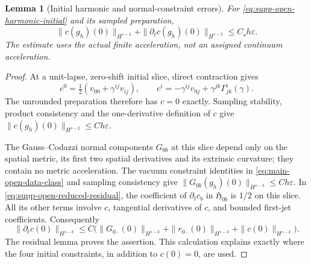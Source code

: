 \documentclass[11pt]{article}
\numberwithin{equation}{section}
\newtheorem{lemma}[lemma]{Lemma}
\theoremstyle{definition}
\theoremstyle{remark}
\begin{document}
\begin{lemma}[Initial harmonic and normal-constraint errors]
\label{lem:supp-open-initial-gauge}
For \eqref{eq:supp-open-harmonic-initial} and its sampled preparation,
\begin{equation}
 \|c(g_h)(0)\|_{H^{s-2}}
 +\|\partial_tc(g_h)(0)\|_{H^{s-3}}
 \le C_sh\varepsilon.
 \label{eq:supp-open-initial-gauge-bound}
\end{equation}
The estimate uses the actual finite acceleration, not an assigned
continuum acceleration.
\end{lemma}
\begin{proof}
At a unit-lapse, zero-shift initial slice, direct contraction gives
\[
 c^0=\tfrac12(v_{00}+\gamma^{ij}v_{ij}),\qquad
 c^i=-\gamma^{ij}v_{0j}
       +\gamma^{jk}\Gamma^i_{jk}(\gamma).
\]
The unrounded preparation therefore has $c=0$ exactly.  Sampling stability,
product consistency and the one-derivative definition of $c$ give
$\|c(g_h)(0)\|_{H^{s-2}}\le Ch\varepsilon$.

The Gauss--Codazzi normal components $G_{0b}$ at this slice depend only on
the spatial metric, its first two spatial derivatives and its extrinsic
curvature; they contain no metric acceleration.  The vacuum constraint
identities in \eqref{eq:main-open-data-class} and sampling consistency give
$\|G_{0b}(g_h)(0)\|_{H^{s-3}}\le Ch\varepsilon$.
In \eqref{eq:supp-open-reduced-residual}, the coefficient of
$\partial_tc_b$ in $\mathfrak H_{0b}$ is $1/2$ on this slice.  All its
other terms involve $c$, tangential derivatives of $c$, and bounded
first-jet coefficients.  Consequently
\[
 \|\partial_tc(0)\|_{H^{s-3}}
 \le C\bigl(\|G_{0\cdot}(0)\|_{H^{s-3}}
       +\|r_{0\cdot}(0)\|_{H^{s-3}}
       +\|c(0)\|_{H^{s-2}}\bigr).
\]
The residual lemma proves the assertion.  This calculation explains exactly
where the four initial constraints, in addition to $c(0)=0$, are used.
\end{proof}
\end{document}

